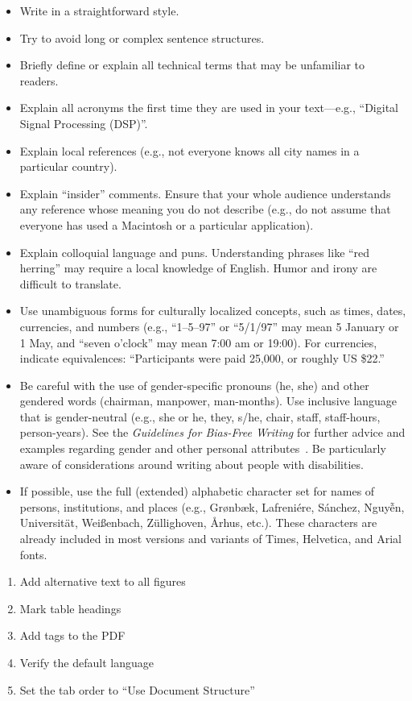 \documentclass{sigchi}
\begin{document}
\begin{itemize} \item Write in a straightforward style.  \item Try to avoid long
or complex sentence structures.  \item Briefly define or explain all technical
terms that may be unfamiliar to readers.  \item Explain all acronyms the first
time they are used in your text---e.g., ``Digital Signal Processing (DSP)''.
\item Explain local references (e.g., not everyone knows all city names in a
particular country).  \item Explain ``insider'' comments. Ensure that your whole
audience understands any reference whose meaning you do not describe (e.g., do
not assume that everyone has used a Macintosh or a particular application).
\item Explain colloquial language and puns. Understanding phrases like ``red
herring'' may require a local knowledge of English.  Humor and irony are
difficult to translate.  \item Use unambiguous forms for culturally localized
concepts, such as times, dates, currencies, and numbers (e.g., ``1--5--97'' or
``5/1/97'' may mean 5 January or 1 May, and ``seven o'clock'' may mean 7:00 am
or 19:00). For currencies, indicate equivalences: ``Participants were paid
{\selectfont \textwon} 25,000, or roughly US \$22.'' \item Be
careful with the use of gender-specific pronouns (he, she) and other gendered
words (chairman, manpower, man-months). Use inclusive language that is
gender-neutral (e.g., she or he, they, s/he, chair, staff, staff-hours,
person-years). See the \textit{Guidelines for Bias-Free Writing} for further
advice and examples regarding gender and other personal
attributes~\cite{Schwartz:1995:GBF}. Be particularly aware of considerations
around writing about people with disabilities.  \item If possible, use the full
(extended) alphabetic character set for names of persons, institutions, and
places (e.g., Gr{\o}nb{\ae}k, Lafreni\'ere, S\'anchez, Nguy{\~{\^{e}}}n,
Universit{\"a}t, Wei{\ss}enbach, Z{\"u}llighoven, \r{A}rhus, etc.).  These
characters are already included in most versions and variants of Times,
Helvetica, and Arial fonts.  \end{itemize}

\begin{enumerate} \item Add alternative text to all figures \item Mark table
headings \item Add tags to the PDF \item Verify the default language \item Set
the tab order to ``Use Document Structure'' \end{enumerate}

\balance{}

 
\end{document}
